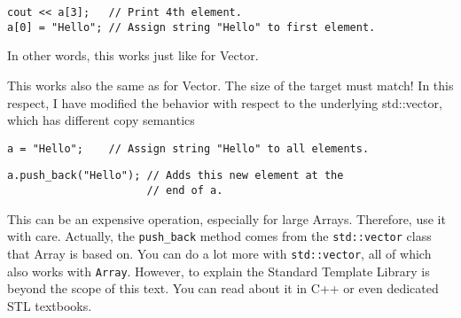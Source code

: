 \begin{verbatim}
cout << a[3];   // Print 4th element.
a[0] = "Hello"; // Assign string "Hello" to first element.
\end{verbatim}

In other words, this works just like for Vector.


This works also the same as for Vector. The size of the target must
match! In this respect, I have modified the behavior with respect to
the underlying std::vector, which has different copy semantics

\begin{verbatim}
a = "Hello";    // Assign string "Hello" to all elements.
\end{verbatim}

\begin{verbatim}
a.push_back("Hello"); // Adds this new element at the
                      // end of a.
\end{verbatim}

This can be an expensive operation, especially for large Arrays.
Therefore, use it with care. Actually, the \verb|push_back| method
comes from the \verb|std::vector| class that Array is based on. You
can do a lot more with \verb|std::vector|, all of which also works
with \verb|Array|. However, to explain the Standard Template Library
is beyond the scope of this text. You can read about it in C++ or even
dedicated STL textbooks.



